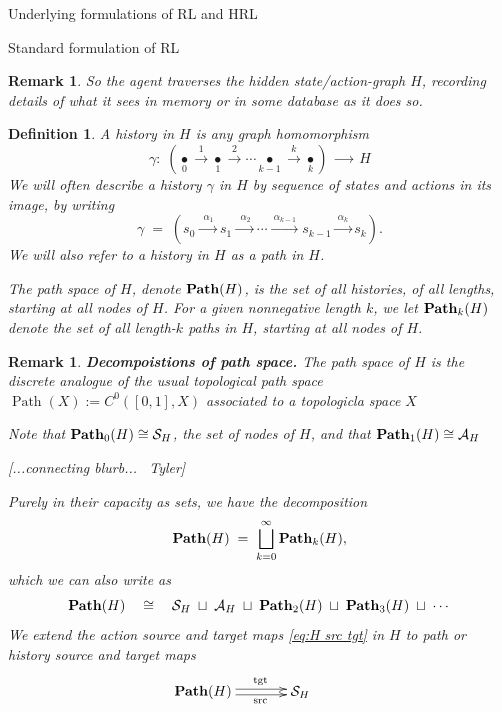 \documentclass[11pt]{article}
\newtheorem{definition}[subsubsection]{Definition}
\newtheorem{remark}[subsubsection]{Remark}
\newcommand{\Path}{\operatorname{Path}}
\begin{document}
\begin{section}{Underlying formulations of RL and HRL}
\begin{subsection}{Standard formulation of RL}
\begin{remark}
So the agent traverses the hidden state/action-graph $H$, recording details of what it sees in memory or in some database as it does so.
\end{remark}

\begin{definition}
\normalfont
A {\em history} in $H$ is any graph homomorphism
$$
\gamma:\;\left(\underset{0}{\bullet}\xrightarrow{\ \ 1\ \ }\underset{1}{\bullet}\xrightarrow{\ \ 2\ \ }\cdots\underset{k-1}{\bullet}\xrightarrow{\ \ k\ \ }\underset{k}{\bullet}\right)
\;\xrightarrow{\ \ \ \ \ \ \ }\;H
$$
We will often describe a history $\gamma$ in $H$ by sequence of states and actions in its image, by writing
\begin{equation}\label{eq: general history}
\gamma\;=\;\left(s_{0}\xrightarrow{\ \ \alpha_{1}\ }s_{1}\xrightarrow{\ \ \alpha_{2}\ }\cdots\xrightarrow{\ \alpha_{k-1}\ }s_{k-1}\xrightarrow{\ \alpha_{k}\ }s_{k}\right).
\end{equation}
We will also refer to a history in $H$ as a {\em path} in $H$.

	The {\em path space} of $H$, denote $\bold{Path}(H)$, is the set of all histories, of all lengths, starting at all nodes of $H$. For a given nonnegative length $k$, we let $\bold{Path}_{k}(H)$ denote the set of all length-$k$ paths in $H$, starting at all nodes of $H$.
\end{definition}

\begin{remark}
{\bf Decompoistions of path space.}
\normalfont
The path space of $H$ is the discrete analogue of the usual topological path space $\Path(X):=C^0([0,1],X)$ associated to a topologicla space $X$

Note that $\bold{Path}_{0}(H)\cong\mathcal{S}_{H}$, the set of nodes of $H$, and that $\bold{Path}_{1}(H)\cong\mathcal{A}_{H}$

{\color{blue} [...connecting blurb... \textemdash\ Tyler]}

Purely in their capacity as sets, we have the decomposition
$$
\bold{Path}(H)\;=\;\bigsqcup_{k=0}^{\infty}\bold{Path}_{k}(H),
$$
which we can also write as
$$
\bold{Path}(H)
\quad\cong\quad
\mathcal{S}_{H}\;\sqcup\;\mathcal{A}_{H}\;\sqcup\;\bold{Path}_{2}(H)\;\sqcup\;\bold{Path}_{3}(H)\;\sqcup\;\cdots
$$
We extend the action source and target maps \eqref{eq:H src tgt} in $H$ to {\em path} or {\em history source} and {\em target} maps
$$
\begin{xy}
(0,0)*+{\!\!\!\!\!\!\!\!\!\!\!\!\!\!\!\bold{Path}(H)}="1";
(20,0)*+{\mathcal{S}_{H}}="2";
{\ar@<2pt>^{\text{tgt}} "1"; "2"}
{\ar@<-2pt>_{\text{src}} "1"; "2"}
\end{xy}
$$
\end{remark}


\end{subsection}
\end{section}
\end{document}

